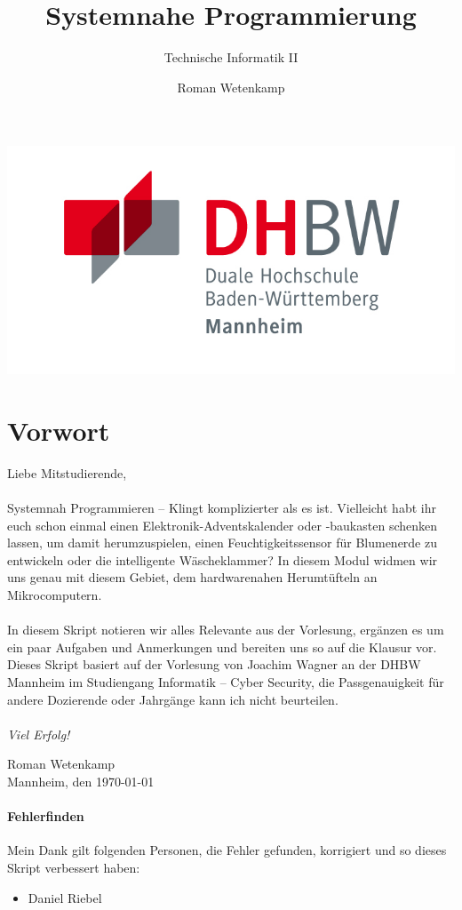 \documentclass[11pt,a4paper]{scrartcl}
\author{Roman Wetenkamp}
\title{Systemnahe Programmierung}
\subtitle{Technische Informatik II}
\begin{document}
\vspace{3cm}
\maketitle
\begin{center}
\includegraphics[scale=0.7]{DHBW.jpg}
\end{center}
\pagebreak
\tableofcontents
\pagebreak
\section*{Vorwort}
Liebe Mitstudierende, \\\\
Systemnah Programmieren -- Klingt komplizierter als es ist. Vielleicht habt ihr euch schon einmal einen Elektronik-Adventskalender oder -baukasten schenken lassen, um damit herumzuspielen, einen Feuchtigkeitssensor für Blumenerde zu entwickeln oder die intelligente Wäscheklammer? In diesem Modul widmen wir uns genau mit diesem Gebiet, dem hardwarenahen Herumtüfteln an Mikrocomputern. \\\\
In diesem Skript notieren wir alles Relevante aus der Vorlesung, ergänzen es um ein paar Aufgaben und Anmerkungen und bereiten uns so auf die Klausur vor. Dieses Skript basiert auf der Vorlesung von Joachim Wagner an der DHBW Mannheim im Studiengang Informatik -- Cyber Security, die Passgenauigkeit für andere Dozierende oder Jahrgänge kann ich nicht beurteilen. \\\\
\textit{Viel Erfolg!}  \\
\begin{flushright}
Roman Wetenkamp \\
Mannheim, den \today
\end{flushright}  
\vfill
\paragraph{Fehlerfinden}
Mein Dank gilt folgenden Personen, die Fehler gefunden, korrigiert und so dieses Skript verbessert haben: 
\begin{itemize}
\item Daniel Riebel
\end{itemize}
\end{document}
